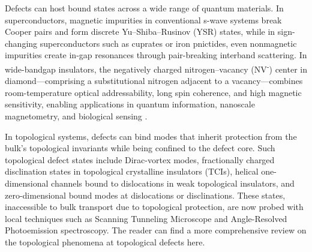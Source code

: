 Defects can host bound states across a wide range of quantum materials. In superconductors, magnetic impurities in conventional s-wave systems break Cooper pairs and form discrete Yu–Shiba–Rusinov (YSR) states\cite{pasnooriRiseFallYuShibaRusinov2022,ortuzarYuShibaRusinovStatesTwodimensional2022}, while in sign-changing superconductors such as cuprates or iron pnictides, even nonmagnetic impurities create in-gap resonances through pair-breaking interband scattering\cite{mashkooriImpurityBoundStates2017,alloulDefectsCorrelatedMetals2009}. In wide-bandgap insulators, the negatively charged nitrogen–vacancy (NV\textsuperscript{-}) center in diamond—comprising a substitutional nitrogen adjacent to a vacancy—combines room-temperature optical addressability, long spin coherence, and high magnetic sensitivity, enabling applications in quantum information, nanoscale magnetometry, and biological sensing \cite{dohertyNitrogenvacancyColourCentre2013}.

In topological systems, defects can bind modes that inherit protection from the bulk’s topological invariants while being confined to the defect core. Such topological defect states include Dirac-vortex modes\cite{gaoMajoranalikeZeroModes2019,menssenPhotonicTopologicalMode2020}, fractionally charged disclination states in topological crystalline insulators (TCIs)\cite{liuBulkdisclinationCorrespondenceTopological2021,petersonTrappedFractionalCharges2021}, helical one-dimensional channels bound to dislocations in weak topological insulators\cite{nayakResolvingTopologicalClassification2019,yeTopologicalDislocationModes2022,xueObservationDislocationInducedTopological2021}, and zero-dimensional bound modes at dislocations or disclinations\cite{grinbergTrappedStateDislocation2020,pauloseTopologicalModesBound2015,liTopologicalLighttrappingDislocation2018,dengObservationDegenerateZeroEnergy2022}. These states, inaccessible to bulk transport due to topological protection, are now probed with local techniques such as Scanning Tunneling Microscope and Angle-Resolved Photoemission spectroscopy. The reader can find a more comprehensive review on the topological phenomena at topological defects here\cite{linTopologicalPhenomenaTopological2022}.

